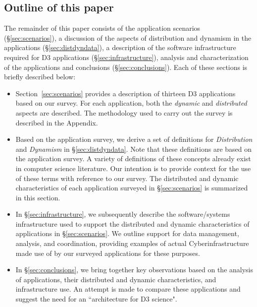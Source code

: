 \subsection{Outline of this paper}

The remainder of this paper consists of
the application scenarios (\S\ref{sec:scenarios}),
a discussion of the aspects of distribution and dynamism in the
applications (\S\ref{sec:distdyndata}),
a description of the software infrastructure required for D3 applications
(\S\ref{sec:infrastructure}),
analysis and characterization of the applications and
conclusions (\S\ref{sec:conclusions}). Each of these sections is briefly described below:

\begin{itemize}

\item Section~\ref{sec:scenarios} provides a description of thirteen D3 applications based on our survey. For each application, both the {\it dynamic} and {\it distributed} aspects are described. The methodology used to carry out the survey is described in the Appendix.

\item Based on the application survey, we derive a set of  definitions for {\it Distribution} and {\it Dynamism} in \S\ref{sec:distdyndata}. Note that these definitions are based on the application survey. A variety of definitions of these concepts already exist in computer science literature. Our intention is
to provide context for the use of these terms with reference to our survey. The distributed and dynamic characteristics of each application surveyed in \S\ref{sec:scenarios} is summarized in this section.

\item In \S\ref{sec:infrastructure}, we subsequently describe the software/systems infrastructure used to support the distributed and dynamic characteristics of applications in \S\ref{sec:scenarios}. We outline support for data management, analysis, and coordination, providing examples of actual Cyberinfrastructure made use of by our surveyed applications for these purposes.

\item In \S\ref{sec:conclusions}, we bring together key observations based on the analysis of applications, their distributed and dynamic characteristics, and infrastructure use. An attempt is made to compare these applications and suggest the need for an ``architecture for D3 science".

\end{itemize}

